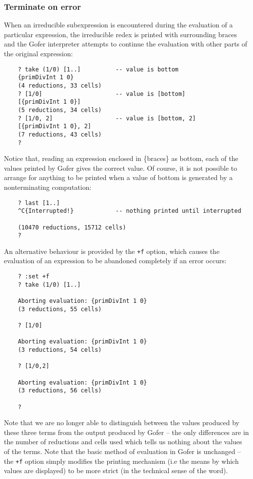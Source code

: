\subsubsection{Terminate on error}
When an irreducible subexpression is encountered during the evaluation
of a particular expression, the irreducible redex is printed with
surrounding braces and the Gofer interpreter attempts to continue the
evaluation with other parts of the original expression:
\begin{verbatim}
    ? take (1/0) [1..]          -- value is bottom
    {primDivInt 1 0}
    (4 reductions, 33 cells)
    ? [1/0]                     -- value is [bottom]
    [{primDivInt 1 0}]
    (5 reductions, 34 cells)
    ? [1/0, 2]                  -- value is [bottom, 2]
    [{primDivInt 1 0}, 2]
    (7 reductions, 43 cells)
    ?
\end{verbatim}
Notice that, reading an expression enclosed in \{braces\} as bottom, each
of the values printed by Gofer gives the correct value.  Of course, it
is not possible to arrange for anything to be printed when a value of
bottom is generated by a nonterminating computation:
\begin{verbatim}
    ? last [1..]
    ^C{Interrupted!}            -- nothing printed until interrupted

    (10470 reductions, 15712 cells)
    ?
\end{verbatim}
An alternative behaviour is provided by the \verb"+f" option, which causes the
evaluation of an expression to be abandoned completely if an error
occurs:
\begin{verbatim}
    ? :set +f
    ? take (1/0) [1..]

    Aborting evaluation: {primDivInt 1 0}
    (3 reductions, 55 cells)

    ? [1/0]

    Aborting evaluation: {primDivInt 1 0}
    (3 reductions, 54 cells)
 
    ? [1/0,2]

    Aborting evaluation: {primDivInt 1 0}
    (3 reductions, 56 cells)

    ?
\end{verbatim}
Note that we are no longer able to distinguish between the values
produced by these three terms from the output produced by Gofer -- the
only differences are in the number of reductions and cells used which
tells us nothing about the values of the terms.  Note that the basic
method of evaluation in Gofer is unchanged -- the \verb"+f" option simply
modifies the printing mechanism (i.e the means by which values are
displayed) to be more strict (in the technical sense of the word).

